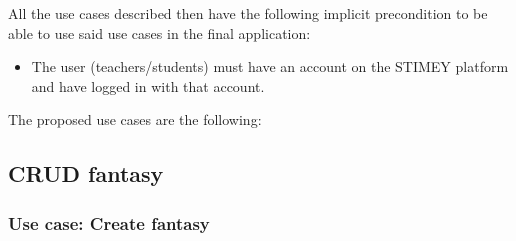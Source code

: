 All the use cases described then have the following implicit precondition to be able to use said use cases in the final application:
\begin{itemize}
	\item The user (teachers/students) must have an account on the STIMEY platform and have logged in with that account.
\end{itemize}

The proposed use cases are the following:

\subsection{CRUD fantasy}
\hypertarget{crearfantasia}{}
\subsubsection{Use case: Create fantasy}
